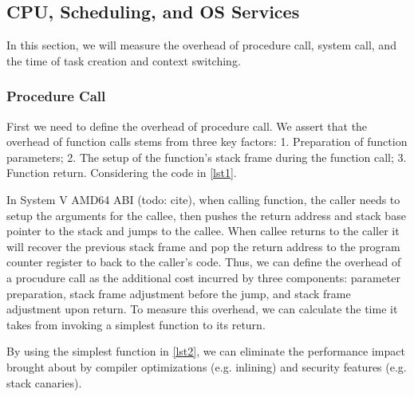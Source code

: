 \subsection{CPU, Scheduling, and OS Services}
In this section, we will measure the overhead of procedure call, system call, and the time of task creation and context switching.

\subsubsection{Procedure Call}
First we need to define the overhead of procedure call. We assert that the overhead of function calls stems from three key factors: 1. Preparation of function parameters; 2. The setup of the function's stack frame during the function call; 3. Function return. Considering the code in \ref{lst1}. 

In System V AMD64 ABI (todo: cite), when calling function, the caller needs to setup the arguments for the callee, then pushes the return address and stack base pointer to the stack and jumps to the callee. When callee returns to the caller it will recover the previous stack frame and pop the return address to the program counter register to back to the caller's code. Thus, we can define the overhead of a procudure call as the additional cost incurred by three components: parameter preparation, stack frame adjustment before the jump, and stack frame adjustment upon return. To measure this overhead, we can calculate the time it takes from invoking a simplest function to its return.

By using the simplest function in \ref{lst2}, we can eliminate the performance impact brought about by compiler optimizations (e.g. inlining) and security features (e.g. stack canaries).

